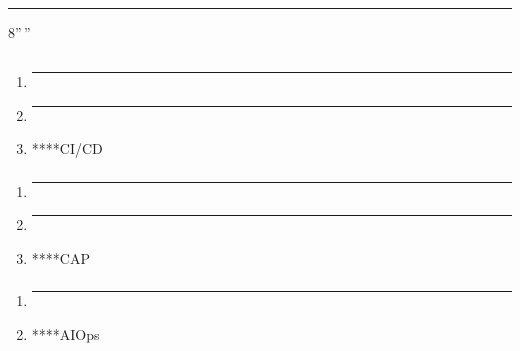 \begin{center}\rule{0.5\linewidth}{0.5pt}\end{center}

8''\,''

\subsection{}\label{section-71}

\subsubsection{}\label{section-72}

\begin{enumerate}
\def\labelenumi{\arabic{enumi}.}
\item
  \begin{center}\rule{0.5\linewidth}{0.5pt}\end{center}
\item
  \begin{center}\rule{0.5\linewidth}{0.5pt}\end{center}
\item
  ****CI/CD
\end{enumerate}

\subsubsection{}\label{section-73}

\begin{enumerate}
\def\labelenumi{\arabic{enumi}.}
\item
  \begin{center}\rule{0.5\linewidth}{0.5pt}\end{center}
\item
  \begin{center}\rule{0.5\linewidth}{0.5pt}\end{center}
\item
  ****CAP
\end{enumerate}

\subsubsection{}\label{section-74}

\begin{enumerate}
\def\labelenumi{\arabic{enumi}.}
\item
  \begin{center}\rule{0.5\linewidth}{0.5pt}\end{center}
\item
  ****AIOps
\end{enumerate}

\subsection{}\label{section-75}